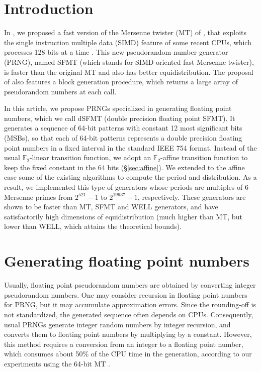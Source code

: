 \documentclass{svmult}
\begin{document}
\section {Introduction}
\label{sec:intro}

In \cite{SFMT}, we proposed a fast version of the Mersenne twister (MT) of \cite{MT},
that exploits the single instruction multiple data (SIMD) feature of some
recent CPUs, which processes 128 bits at a time \cite{wiki:SIMD}.
This new pseudorandom number generator (PRNG), named SFMT (which stands for SIMD-oriented
fast Mersenne twister), is faster than the original MT and also has better
equidistribution. The proposal of \cite{SFMT} also features a block generation
procedure, which returns a large array of pseudorandom numbers at
each call.


In this article, we propose PRNGs
specialized in generating floating point numbers, which
we call dSFMT (double precision floating point SFMT).
It generates a sequence of 64-bit patterns with constant
12 most significant bits (MSBs), so that each of 64-bit patterns
represents a double precision floating point numbers in a fixed
interval in the standard IEEE 754 format.
Instead of the usual ${\mathbb F}_2$-linear transition function,
we adopt an ${\mathbb F}_2$-affine transition function to keep the
fixed constant in the 64 bits (\S\ref{sec:affine}). We extended
to the affine case
some of the existing algorithms to compute the period and distribution.
As a result, we implemented this type of generators whose periods
are multiples of
6 Mersenne primes from $2^{521}-1$ to $2^{19937}-1$, respectively.
These generators are shown to be faster than MT, SFMT and WELL generators,
and have satisfactorily high dimensions of equidistribution
(much higher than MT, but lower than WELL, which attains the theoretical bounds).


\section{Generating floating point numbers}
\label{sec:floating}\label{sec:ieee}

Usually, floating point pseudorandom numbers are obtained by
converting integer pseudorandom numbers.
One may consider recursion in floating
point numbers for PRNG, but it may accumulate approximation errors.
Since the rounding-off is not standardized, the generated
sequence often depends on CPUs.
Consequently, usual PRNGs generate integer random numbers by integer recursion,
and converts them
to floating point numbers by multiplying by a constant.
However, this method requires a conversion from an integer to
a floating point number, which consumes about 50\% of the CPU time
in the generation, according to our experiments using
the 64-bit MT \cite{MT64}.
\end{document}
